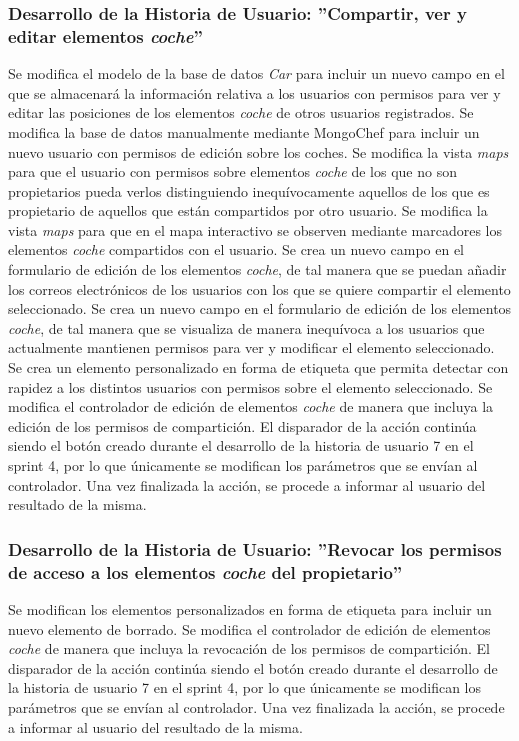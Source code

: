 	\subsubsection{Desarrollo de la Historia de Usuario: ''Compartir, ver y editar elementos \textit{coche}'' }
	Se modifica el modelo de la base de datos \textit{Car} para incluir un nuevo campo en el que se almacenará la información relativa a los usuarios con permisos para ver y editar las posiciones de los elementos \textit{coche} de otros usuarios registrados.
	Se modifica la base de datos manualmente mediante MongoChef para incluir un nuevo usuario con permisos de edición sobre los coches.
	Se modifica la vista \textit{maps} para que el usuario con permisos sobre elementos \textit{coche} de los que no son propietarios pueda verlos distinguiendo inequívocamente aquellos de los que es propietario de aquellos que están compartidos por otro usuario.
	Se modifica la vista \textit{maps} para que en el mapa interactivo se observen mediante marcadores los elementos \textit{coche} compartidos con el usuario.
	Se crea un nuevo campo en el formulario de edición de los elementos \textit{coche}, de tal manera que se puedan añadir los correos electrónicos de los usuarios con los que se quiere compartir el elemento seleccionado. Se crea un nuevo campo en el formulario de edición de los elementos \textit{coche}, de tal manera que se visualiza de manera inequívoca a los usuarios que actualmente mantienen permisos para ver y modificar el elemento seleccionado. Se crea un elemento personalizado en forma de etiqueta que permita detectar con rapidez a los distintos usuarios con permisos sobre el elemento seleccionado.
	 Se modifica el controlador de edición de elementos \textit{coche} de manera que incluya la edición de los permisos de compartición.
	 El disparador de la acción continúa siendo el botón creado durante el desarrollo de la historia de usuario 7 en el sprint 4, por lo que únicamente se modifican los parámetros que se envían al controlador.
	 Una vez finalizada la acción, se procede a informar al usuario del resultado de la misma.

	\subsubsection{Desarrollo de la Historia de Usuario: ''Revocar los permisos de acceso a los elementos \textit{coche} del propietario''}	
	Se modifican los elementos personalizados en forma de etiqueta para incluir un nuevo elemento de borrado.
	Se modifica el controlador de edición de elementos \textit{coche} de manera que incluya la revocación de los permisos de compartición.
	El disparador de la acción continúa siendo el botón creado durante el desarrollo de la historia de usuario 7 en el sprint 4, por lo que únicamente se modifican los parámetros que se envían al controlador.
	 Una vez finalizada la acción, se procede a informar al usuario del resultado de la misma.
	
